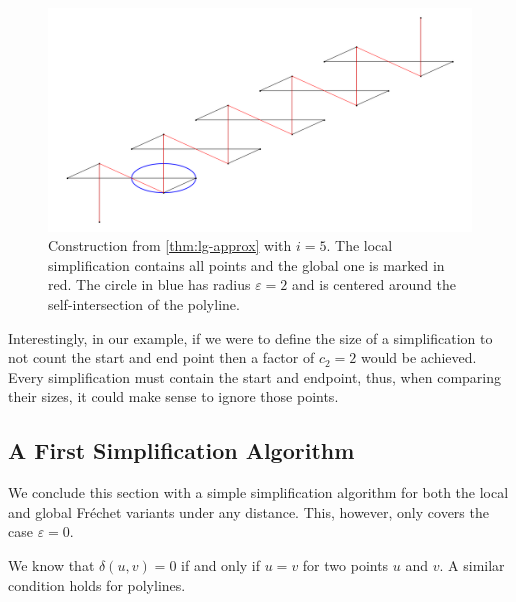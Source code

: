 \begin{figure}[h!tbp]
  \centering
	\includegraphics[scale=0.3]{./figures/local-global-bigdiff.png}
	\caption{Construction from \cref{thm:lg-approx} with \(i = 5\). The local simplification contains all points and the global one is marked in red. The circle in blue has radius \(\varepsilon = 2\) and is centered around the self-intersection of the polyline.}
  \label{fig:local-global-bigdiff}
\end{figure}

Interestingly, in our example, if we were to define the size of a simplification to not count the start and end point then a factor of \(c_2 = 2\) would be achieved. Every simplification must contain the start and endpoint, thus, when comparing their sizes, it could make sense to ignore those points.

\subsection{A First Simplification Algorithm}
We conclude this section with a simple simplification algorithm for both the local and global Fréchet variants under any distance. This, however, only covers the case \(\varepsilon = 0\).

We know that \(\delta(u, v) = 0\) if and only if \(u = v\) for two points \(u\) and \(v\). A similar condition holds for polylines.

